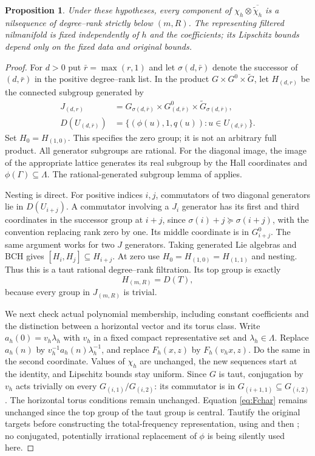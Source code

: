 \documentclass[11pt]{article}
\newtheorem{proposition}[theorem]{Proposition}
\begin{document}
\begin{proposition}\label{prop:comparison}
Under these hypotheses, every component of
$\chi_h\otimes\overline{\widetilde\chi_h}$ is a nilsequence of
degree--rank strictly below $(m,R)$. The representing filtered nilmanifold
is fixed independently of $h$ and the coefficients; its Lipschitz bounds
depend only on the fixed data and original bounds.
\end{proposition}
\begin{proof}
For $d>0$ put $\bar r=\max(r,1)$ and let $\sigma(d,\bar r)$ denote the
successor of $(d,\bar r)$ in the positive degree--rank list. In the product
$G\times G^0\times\widetilde G$, let $H_{(d,r)}$ be the connected subgroup
generated by
\begin{align*}
 J_{(d,r)}&=G_{\sigma(d,\bar r)}\times G^0_{(d,\bar r)}
                        \times\widetilde G_{\sigma(d,\bar r)},\\
 D(U_{(d,\bar r)})&=\{(\phi(u),1,q(u)):u\in U_{(d,\bar r)}\}.
\end{align*}
Set $H_0=H_{(1,0)}$. This specifies the zero group; it is not an arbitrary
full product. All generator subgroups are rational. For the diagonal image,
the image of the appropriate lattice generates its real subgroup by the
Hall coordinates and $\phi(\Gamma)\subseteq\Lambda$. The rational-generated
subgroup lemma of \cite[Section 2]{LP13} applies.

Nesting is direct. For positive indices $i,j$, commutators of two diagonal
generators lie in $D(U_{i+j})$. A commutator involving a $J_i$ generator
has its first and third coordinates in the successor group at $i+j$,
since $\sigma(i)+j\succeq\sigma(i+j)$, with the convention replacing
rank zero by one. Its middle coordinate is in $G^0_{i+j}$. The same
argument works for two $J$ generators. Taking generated Lie algebras and
BCH gives $[H_i,H_j]\subseteq H_{i+j}$. At zero use
$H_0=H_{(1,0)}=H_{(1,1)}$ and nesting. Thus this is a taut rational
degree--rank filtration. Its top group is exactly
\begin{equation}\label{eq:Htop}
 H_{(m,R)}=D(T),
\end{equation}
because every group in $J_{(m,R)}$ is trivial.

We next check actual polynomial membership, including constant coefficients
and the distinction between a horizontal vector and its torus class.
Write $a_h(0)=v_h\lambda_h$ with $v_h$ in a fixed compact representative
set and $\lambda_h\in\Lambda$. Replace $a_h(n)$ by
$v_h^{-1}a_h(n)\lambda_h^{-1}$, and replace $F_h(x,z)$ by $F_h(v_hx,z)$.
Do the same in the second coordinate. Values of $\chi_h$ are unchanged,
the new sequences start at the identity, and Lipschitz bounds stay uniform.
Since $G$ is taut, conjugation by $v_h$ acts trivially on every
$G_{(i,1)}/G_{(i,2)}$: its commutator is in
$G_{(i+1,1)}\subseteq G_{(i,2)}$. The horizontal torus conditions remain
unchanged. Equation \eqref{eq:Fchar} remains unchanged since the top group
of the taut group is central. Tautify the original targets before constructing
the total-frequency representation, using \cite{TAUT} and then
\cite[Lemma 9.12]{GTZ}; no conjugated, potentially irrational replacement
of $\phi$ is being silently used here.


\end{proof}
\end{document}
